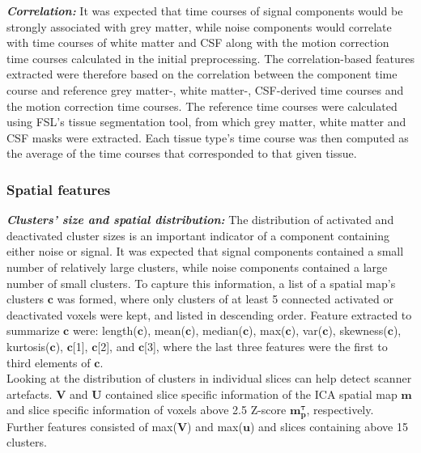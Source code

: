 \textbf{\textit{Correlation:}} It was expected that time courses of signal components would be strongly associated with grey matter, while noise components would correlate with time courses of white matter and CSF along with the motion correction time courses calculated in the initial preprocessing. The correlation-based features extracted were therefore based on the correlation between the component time course and reference grey matter-, white matter-, CSF-derived time courses and the motion correction time courses. The reference time courses were calculated using FSL’s tissue segmentation tool, from which grey matter, white matter and CSF masks were extracted. Each tissue type's time course was then computed as the average of the time courses that corresponded to that given tissue. \cite{Salimi-Khorshidi2014}

\subsubsection{Spatial features}
\textbf{\textit{Clusters’ size and spatial distribution:}} The distribution of activated and deactivated cluster sizes is an important indicator of a component containing either noise or signal. It was expected that signal components contained a small number of relatively large clusters, while noise components contained a large number of small clusters. To capture this information, a list of a spatial map’s clusters $\mathbf{c}$ was formed, where only clusters of at least 5 connected activated or deactivated voxels were kept, and listed in descending order. Feature extracted to summarize $\mathbf{c}$ were: length($\mathbf{c}$), mean($\mathbf{c}$), median($\mathbf{c}$), max($\mathbf{c}$), var($\mathbf{c}$), skewness($\mathbf{c}$), kurtosis($\mathbf{c}$), $\mathbf{c}$[1], $\mathbf{c}$[2], and $\mathbf{c}$[3], where the last three features were the first to third elements of $\mathbf{c}$.\\
Looking at the distribution of clusters in individual slices can help detect scanner artefacts. $\mathbf{V}$ and $\mathbf{U}$ contained slice specific information of the ICA spatial map $\mathbf{m}$ and slice specific information of voxels above 2.5 Z-score $\mathbf{m^{\tau}_{p}}$, respectively. Further features consisted of max($\mathbf{V}$) and max($\mathbf{u}$) and slices containing above 15 clusters.\\ %
